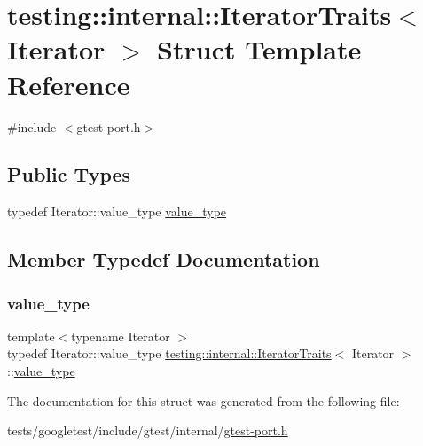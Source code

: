 \hypertarget{structtesting_1_1internal_1_1IteratorTraits}{}\section{testing\+:\+:internal\+:\+:Iterator\+Traits$<$ Iterator $>$ Struct Template Reference}
\label{structtesting_1_1internal_1_1IteratorTraits}


{\ttfamily \#include $<$gtest-\/port.\+h$>$}

\subsection*{Public Types}
\begin{DoxyCompactItemize}
\item 
typedef Iterator\+::value\+\_\+type \hyperlink{structtesting_1_1internal_1_1IteratorTraits_a29de4320a9c53ce438d3561b94e515bb}{value\+\_\+type}
\end{DoxyCompactItemize}


\subsection{Member Typedef Documentation}
\mbox{\label{structtesting_1_1internal_1_1IteratorTraits_a29de4320a9c53ce438d3561b94e515bb}} 
\subsubsection{\texorpdfstring{value\+\_\+type}{value\_type}}
{\footnotesize\ttfamily template$<$typename Iterator $>$ \\
typedef Iterator\+::value\+\_\+type \hyperlink{structtesting_1_1internal_1_1IteratorTraits}{testing\+::internal\+::\+Iterator\+Traits}$<$ Iterator $>$\+::\hyperlink{structtesting_1_1internal_1_1IteratorTraits_a29de4320a9c53ce438d3561b94e515bb}{value\+\_\+type}}



The documentation for this struct was generated from the following file\+:\begin{DoxyCompactItemize}
\item 
tests/googletest/include/gtest/internal/\hyperlink{gtest-port_8h}{gtest-\/port.\+h}\end{DoxyCompactItemize}
